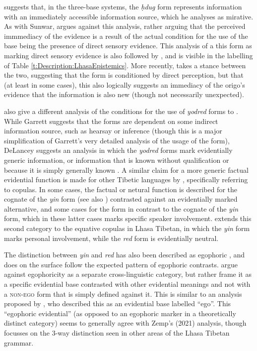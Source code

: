  suggests that, in the three-base systems, the \textit{ḥdug} form represents information with an immediately accessible information source, which he analyses as mirative. As with Sunwar,  argues against this analysis, rather arguing that the perceived immmediacy of the evidence is a result of the actual condition for the use of the base being the presence of direct sensory evidence. This analysis of a this form as marking direct sensory evidence is also followed by , and is visible in the labelling of Table \ref{t:Description:LhasaEpistemics}. More recently,  takes a stance between the two, suggesting that the form is conditioned by direct perception, but that (at least in some cases), this also logically suggests an immediacy of the origo's evidence that the information is also new (though not necessarily unexpected).

 also give a different analysis of the conditions for the use of \textit{yodred} forms to . While Garrett suggests that the forms are dependent on some indirect information source, such as hearsay or inference (though this is a major simplification of Garrett's very detailed analysis of the usage of the form), DeLancey suggests an analysis in which the \textit{yodred} forms mark evidentially generic information, or information that is known without qualification or because it is simply generally known \cite[392]{DeLancey2017Tibetan}. A similar claim for a more generic factual evidential function is made for other Tibetic languages by , specifically referring to copulas. In some cases, the factual or netural function is described for the cognate of the \textit{yin} form (see also ) contrasted against an evidentially marked alternative, and some cases for the form in contrast to the cognate of the \textit{yin} form, which in these latter cases marks specific speaker involvement.  extends this second category to the equative copulas in Lhasa Tibetan, in which the \textit{yin} form marks personal involvement, while the \textit{red} form is evidentially neutral.

The distinction between \textit{yin} and \textit{red} has also been described as egophoric \cite{EgoIntro}, and does on the surface follow the expected pattern of egophoric contrasts.  argue against egophoricity as a separate cross-linguistic category, but rather frame it as a specific evidential base contrasted with other evidential meanings and not with a \textsc{non-ego} form that is simply defined against it. This is similar to an analysis proposed by , who described this as an evidential base labelled ``ego''. This ``egophoric evidential'' (as opposed to an egophoric marker in a theoretically distinct category) seems to generally agree with Zemp's (2021) analysis, though focusses on the 3-way distinction seen in other areas of the Lhasa Tibetan grammar. 

